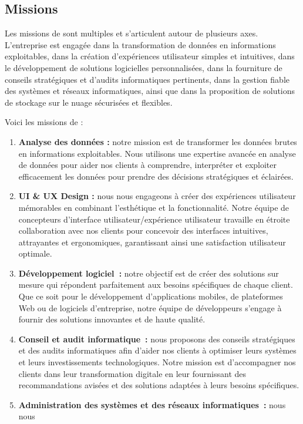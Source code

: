 \subsection{Missions}
Les missions de \firm sont multiples et s’articulent autour de plusieurs axes. L’entreprise
est engagée dans la transformation de données en informations exploitables, dans
la création d’expériences utilisateur simples et intuitives, dans le développement de solutions
logicielles personnalisées, dans la fourniture de conseils stratégiques et d’audits
informatiques pertinents, dans la gestion fiable des systèmes et réseaux informatiques,
ainsi que dans la proposition de solutions de stockage sur le nuage sécurisées et flexibles.

Voici les missions de \firm :
\begin{enumerate}
  \item \textbf{Analyse des données :} notre mission est de transformer les données brutes
    en informations exploitables. Nous utilisons une expertise avancée en analyse
    de données pour aider nos clients à comprendre, interpréter et exploiter efficacement
    les données pour prendre des décisions stratégiques et éclairées.
  \item \textbf{UI \& UX Design :} nous nous engageons à créer des expériences utilisateur mémorables
    en combinant l’esthétique et la fonctionnalité. Notre équipe de concepteurs
    d’interface utilisateur/expérience utilisateur travaille en étroite collaboration
    avec nos clients pour concevoir des interfaces intuitives, attrayantes et ergonomiques,
    garantissant ainsi une satisfaction utilisateur optimale.
  \item \textbf{Développement logiciel :} notre objectif est de créer des solutions sur
    mesure qui répondent parfaitement aux besoins spécifiques de chaque client.
    Que ce soit pour le développement d’applications mobiles, de plateformes Web
    ou de logiciels d’entreprise, notre équipe de développeurs s’engage à fournir
    des solutions innovantes et de haute qualité.
  \item \textbf{Conseil et audit informatique :} nous proposons des conseils stratégiques
    et des audits informatiques afin d’aider nos clients à optimiser leurs systèmes
    et leurs investissements technologiques. Notre mission est d’accompagner nos
    clients dans leur transformation digitale en leur fournissant des recommandations
    avisées et des solutions adaptées à leurs besoins spécifiques.
  \item \textbf{Administration des systèmes et des réseaux informatiques :} nous nous

\end{enumerate}
